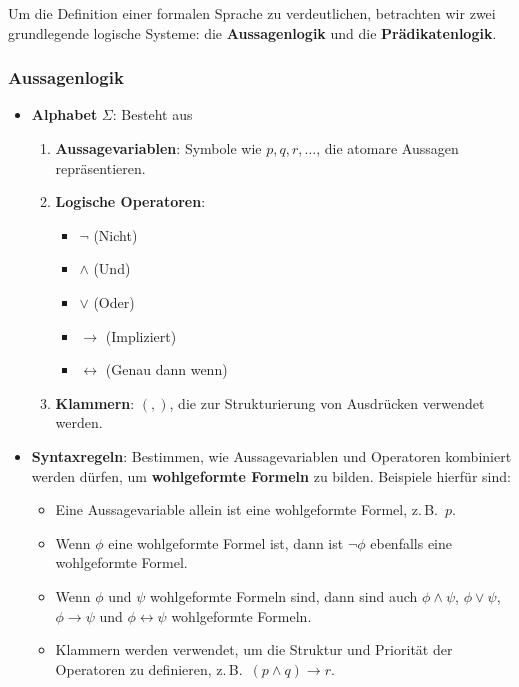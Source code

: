 \documentclass{book}
\theoremstyle{plain}
\theoremstyle{remark}
\theoremstyle{definition}
\begin{document}
Um die Definition einer formalen Sprache zu verdeutlichen, betrachten wir zwei grundlegende logische Systeme: die \textbf{Aussagenlogik} und die \textbf{Prädikatenlogik}.

\subsubsection{Aussagenlogik}

\begin{itemize}
    \item \textbf{Alphabet} \( \Sigma \): Besteht aus
    \begin{enumerate}
        \item \textbf{Aussagevariablen}: Symbole wie \( p, q, r, \ldots \), die atomare Aussagen repräsentieren.
        \item \textbf{Logische Operatoren}: 
        \begin{itemize}
            \item \( \neg \) (Nicht)
            \item \( \land \) (Und)
            \item \( \lor \) (Oder)
            \item \( \rightarrow \) (Impliziert)
            \item \( \leftrightarrow \) (Genau dann wenn)
        \end{itemize}
        \item \textbf{Klammern}: \( (, ) \), die zur Strukturierung von Ausdrücken verwendet werden.
    \end{enumerate}
    
    \item \textbf{Syntaxregeln}: Bestimmen, wie Aussagevariablen und Operatoren kombiniert werden dürfen, um \textbf{wohlgeformte Formeln} zu bilden. Beispiele hierfür sind:
    \begin{itemize}
        \item Eine Aussagevariable allein ist eine wohlgeformte Formel, z.\,B.\ \( p \).
        \item Wenn \( \phi \) eine wohlgeformte Formel ist, dann ist \( \neg \phi \) ebenfalls eine wohlgeformte Formel.
        \item Wenn \( \phi \) und \( \psi \) wohlgeformte Formeln sind, dann sind auch \( \phi \land \psi \), \( \phi \lor \psi \), \( \phi \rightarrow \psi \) und \( \phi \leftrightarrow \psi \) wohlgeformte Formeln.
        \item Klammern werden verwendet, um die Struktur und Priorität der Operatoren zu definieren, z.\,B.\ \( (p \land q) \rightarrow r \).
    \end{itemize}
\end{itemize}
\end{document}
